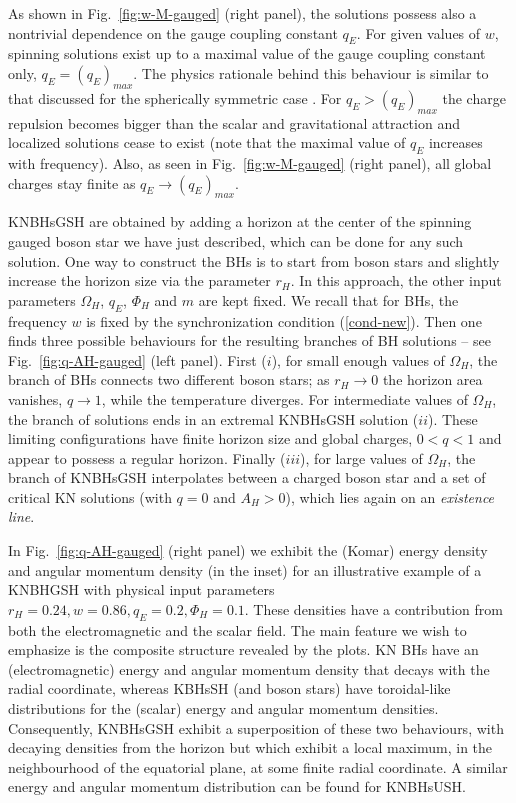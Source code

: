 As shown in Fig.~\ref{fig:w-M-gauged} (right panel), 
the solutions possess also a nontrivial dependence on 
the gauge coupling constant $q_E$.
For given values of $w$,
spinning solutions exist up to a maximal
value of the gauge coupling constant only, $q_E=(q_E)_{max}$.
The physics rationale behind this behaviour 
is similar to that discussed for the spherically symmetric case 
\cite{Jetzer:1989av,Pugliese:2013gsa}.
For $q_E>(q_E)_{max}$ the charge repulsion  becomes bigger than
  the scalar and gravitational attraction and localized solutions cease to exist  
(note that the maximal value of $q_E$
increases with frequency).
Also, as seen in Fig.~\ref{fig:w-M-gauged} (right panel),
all global charges stay finite as $q_E\to (q_E)_{max}$.
 

KNBHsGSH are obtained by adding a horizon at the center of the spinning gauged boson star  
we have just described, which can be done for  any such  solution.
One way to construct the BHs
  is to  start from  boson stars 
and slightly increase the horizon size via the parameter $r_H$.
In this approach, the other input parameters 
$\Omega_H$, $q_E$,  $\Phi_H$ and $m$
are kept fixed. 
We recall that for BHs, the frequency $w$ is fixed by the synchronization condition (\ref{cond-new}).
Then one finds three 
possible behaviours for
the resulting branches of BH solutions -- see Fig.~\ref{fig:q-AH-gauged} (left panel).
 First  ($i$), for small enough values of $\Omega_H$,
 the branch of BHs connects two different boson stars; 
as $r_H\to 0$ the horizon area vanishes, $q\to 1$, while the temperature
 diverges.
For intermediate values of  $\Omega_H$,
the branch of solutions ends in an extremal KNBHsGSH solution ($ii$). 
These limiting configurations have finite
horizon size   and global charges, $0<q<1$ and appear to possess 
a regular horizon.
Finally   ($iii$), for large values of $\Omega_H$,
the branch of  KNBHsGSH interpolates between 
a charged boson star and a set of critical KN solutions (with $q=0$ and $A_H>0$), which lies again 
on an {\it existence line}. 

 In Fig.~\ref{fig:q-AH-gauged} (right panel) we exhibit the (Komar) energy density and angular momentum density (in the inset) for an illustrative example of a KNBHGSH  with physical input parameters 
$r_H=0.24, w =0.86, q_E =0.2, \Phi_H=0.1$. 
These densities have a contribution from both the electromagnetic and the scalar field. The main feature we wish to emphasize is the composite structure revealed by the plots. KN BHs have an (electromagnetic) energy and angular momentum density that decays with the radial coordinate, whereas KBHsSH 
(and boson stars)
have toroidal-like distributions for the (scalar) energy and angular momentum densities. 
Consequently, KNBHsGSH exhibit a superposition of these two behaviours, with decaying densities from the horizon but which exhibit a local maximum, in the neighbourhood of the equatorial plane, at some finite radial coordinate. 
A similar energy and angular momentum distribution can be found for KNBHsUSH.  


